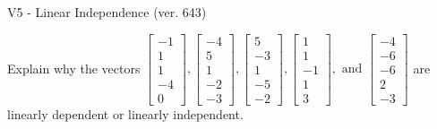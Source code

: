 \begin{exercise}
  \begin{exerciseTitle}V5 - Linear Independence (ver. 643)\end{exerciseTitle}
  \begin{exerciseStatement}
    Explain why the vectors \(\left[\begin{array}{r}
-1 \\
1 \\
1 \\
-4 \\
0
\end{array}\right] , \left[\begin{array}{r}
-4 \\
5 \\
1 \\
-2 \\
-3
\end{array}\right] , \left[\begin{array}{r}
5 \\
-3 \\
1 \\
-5 \\
-2
\end{array}\right] , \left[\begin{array}{r}
1 \\
1 \\
-1 \\
1 \\
3
\end{array}\right] , \text{ and } \left[\begin{array}{r}
-4 \\
-6 \\
-6 \\
2 \\
-3
\end{array}\right]\) are linearly dependent or linearly independent.	



\end{exerciseStatement}
\end{exercise}
